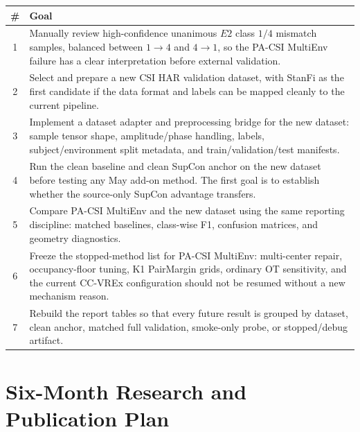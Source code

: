 \documentclass[11pt]{article}
\begin{document}
\begin{longtable}{@{}cp{5.75in}@{}}
\toprule
\# & Goal \\
\midrule
\endhead
1 & Manually review high-confidence unanimous $E2$ class $1/4$ mismatch samples, balanced between $1\rightarrow4$ and $4\rightarrow1$, so the PA-CSI MultiEnv failure has a clear interpretation before external validation. \\
2 & Select and prepare a new CSI HAR validation dataset, with StanFi as the first candidate if the data format and labels can be mapped cleanly to the current pipeline. \\
3 & Implement a dataset adapter and preprocessing bridge for the new dataset: sample tensor shape, amplitude/phase handling, labels, subject/environment split metadata, and train/validation/test manifests. \\
4 & Run the clean baseline and clean SupCon anchor on the new dataset before testing any May add-on method. The first goal is to establish whether the source-only SupCon advantage transfers. \\
5 & Compare PA-CSI MultiEnv and the new dataset using the same reporting discipline: matched baselines, class-wise F1, confusion matrices, and geometry diagnostics. \\
6 & Freeze the stopped-method list for PA-CSI MultiEnv: multi-center repair, occupancy-floor tuning, K1 PairMargin grids, ordinary OT sensitivity, and the current CC-VREx configuration should not be resumed without a new mechanism reason. \\
7 & Rebuild the report tables so that every future result is grouped by dataset, clean anchor, matched full validation, smoke-only probe, or stopped/debug artifact. \\
\bottomrule
\end{longtable}

\clearpage
\section{Six-Month Research and Publication Plan}
\end{document}

